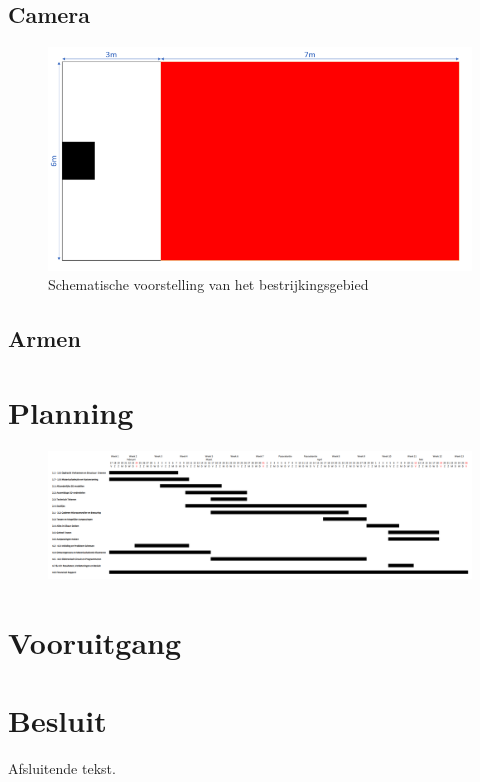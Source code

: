 \documentclass[kulak]{kulakarticle} %
\begin{document}
\subsection{Camera}
\begin{figure}
	\centering
	\includegraphics{schematische voorstelling bestrijkingsgebied LATEX}
	\caption{Schematische voorstelling van het bestrijkingsgebied}
	\label{bestrijkingsgebied}
\end{figure}


\subsection{Armen}



\section{Planning}

\begin{figure} 
	\centering
	\includegraphics[width=1.45\textwidth, angle = 270 ]{ganttchart_LATEX}
\end{figure}


\section{Vooruitgang}


\section*{Besluit}

Afsluitende tekst.
\end{document}
